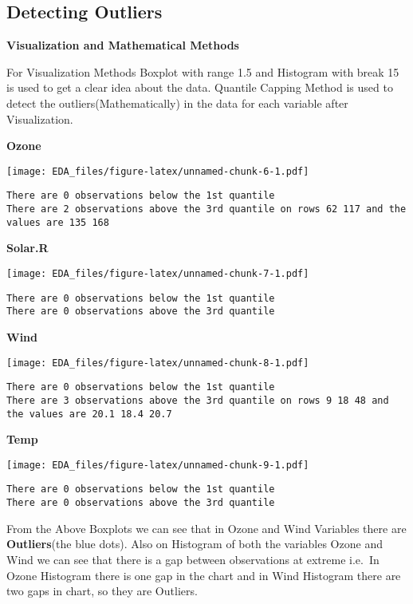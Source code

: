 \documentclass[12pt,]{article}
\begin{document}
\subsection{\texorpdfstring{\textbf{Detecting
Outliers}}{Detecting Outliers}}\label{detecting-outliers}

\textbf{Visualization and Mathematical Methods}

For Visualization Methods Boxplot with range 1.5 and Histogram with
break 15 is used to get a clear idea about the data. Quantile Capping
Method is used to detect the outliers(Mathematically) in the data for
each variable after Visualization.

\textbf{Ozone}

\texttt{[image: EDA\_files/figure-latex/unnamed-chunk-6-1.pdf]}

\begin{verbatim}
There are 0 observations below the 1st quantile
There are 2 observations above the 3rd quantile on rows 62 117 and the values are 135 168 
\end{verbatim}

\textbf{Solar.R}

\texttt{[image: EDA\_files/figure-latex/unnamed-chunk-7-1.pdf]}

\begin{verbatim}
There are 0 observations below the 1st quantile
There are 0 observations above the 3rd quantile
\end{verbatim}

\textbf{Wind}

\texttt{[image: EDA\_files/figure-latex/unnamed-chunk-8-1.pdf]}

\begin{verbatim}
There are 0 observations below the 1st quantile
There are 3 observations above the 3rd quantile on rows 9 18 48 and the values are 20.1 18.4 20.7 
\end{verbatim}

\textbf{Temp}

\texttt{[image: EDA\_files/figure-latex/unnamed-chunk-9-1.pdf]}

\begin{verbatim}
There are 0 observations below the 1st quantile
There are 0 observations above the 3rd quantile
\end{verbatim}

From the Above Boxplots we can see that in Ozone and Wind Variables
there are \textbf{Outliers}(the blue dots). Also on Histogram of both
the variables Ozone and Wind we can see that there is a gap between
observations at extreme i.e.~In Ozone Histogram there is one gap in the
chart and in Wind Histogram there are two gaps in chart, so they are
Outliers.
\end{document}
